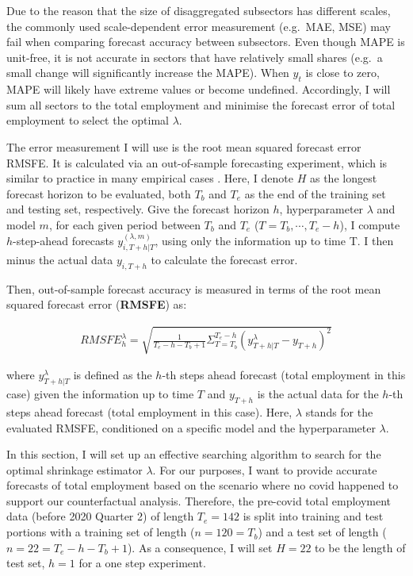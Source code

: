 \documentclass{monashthesis}
\begin{document}
Due to the reason that the size of disaggregated subsectors has different scales, the commonly used scale-dependent error measurement (e.g.~MAE, MSE) may fail when comparing forecast accuracy between subsectors. Even though MAPE is unit-free, it is not accurate in sectors that have relatively small shares (e.g.~a small change will significantly increase the MAPE). When \(y_t\) is close to zero, MAPE will likely have extreme values or become undefined. Accordingly, I will sum all sectors to the total employment and minimise the forecast error of total employment to select the optimal \(\lambda\).

The error measurement I will use is the root mean squared forecast error RMSFE. It is calculated via an out-of-sample forecasting experiment, which is similar to practice in many empirical cases \autocite{banbura2010large,koop2013}. Here, I denote \(H\) as the longest forecast horizon to be evaluated, both \(T_{b}\) and \(T_{e}\) as the end of the training set and testing set, respectively. Give the forecast horizon \(h\), hyperparameter \(\lambda\) and model \(m\), for each given period between \(T_{b}\) and \(T_{e}\) (\(T=T_b,\cdots,T_{e}-h\)), I compute \(h\)-step-ahead forecasts \({y}_{i,T+h|T}^{(\lambda,m)}\), using only the information up to time T. I then minus the actual data \(y_{i,T+h}\) to calculate the forecast error.

Then, out-of-sample forecast accuracy is measured in terms of the root mean squared forecast error (\textbf{RMSFE}) as:

\[
\begin{aligned}
RMSFE^{\lambda}_{h}=\sqrt{\frac{1}{T_e-h-T_b+1}\Sigma^{T_{e}-h}_{T=T_{b}}({y}_{T+h|T}^{\lambda}-y_{T+h})^2}
\end{aligned}
\]

where \({y}_{T+h|T}^{\lambda}\) is defined as the \(h\)-th steps ahead forecast (total employment in this case) given the information up to time \(T\) and \(y_{T+h}\) is the actual data for the \(h\)-th steps ahead forecast (total employment in this case). Here, \(\lambda\) stands for the evaluated RMSFE, conditioned on a specific model and the hyperparameter \(\lambda\).

In this section, I will set up an effective searching algorithm to search for the optimal shrinkage estimator \(\lambda\). For our purposes, I want to provide accurate forecasts of total employment based on the scenario where no covid happened to support our counterfactual analysis. Therefore, the pre-covid total employment data (before 2020 Quarter 2) of length \(T_e=142\) is split into training and test portions with a training set of length (\(n=120=T_b\)) and a test set of length (\(n=22=T_e-h-T_b+1\)). As a consequence, I will set \(H=22\) to be the length of test set, \(h=1\) for a one step experiment.
\end{document}
